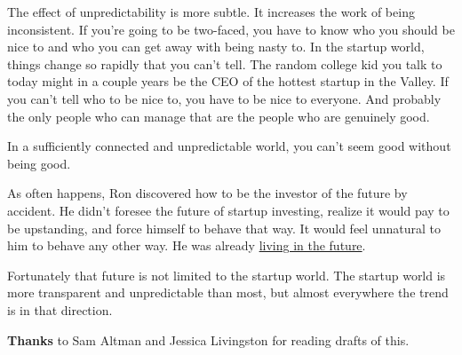 The effect of unpredictability is more subtle. It increases the work of
being inconsistent. If you're going to be two-faced, you have to know
who you should be nice to and who you can get away with being nasty to.
In the startup world, things change so rapidly that you can't tell. The
random college kid you talk to today might in a couple years be the CEO
of the hottest startup in the Valley. If you can't tell who to be nice
to, you have to be nice to everyone. And probably the only people who
can manage that are the people who are genuinely good.

In a sufficiently connected and unpredictable world, you can't seem good
without being good.

As often happens, Ron discovered how to be the investor of the future by
accident. He didn't foresee the future of startup investing, realize it
would pay to be upstanding, and force himself to behave that way. It
would feel unnatural to him to behave any other way. He was already
\href{startupideas.html}{living in the future}.

Fortunately that future is not limited to the startup world. The startup
world is more transparent and unpredictable than most, but almost
everywhere the trend is in that direction.


\textbf{Thanks} to Sam Altman and Jessica Livingston for reading drafts
of this.